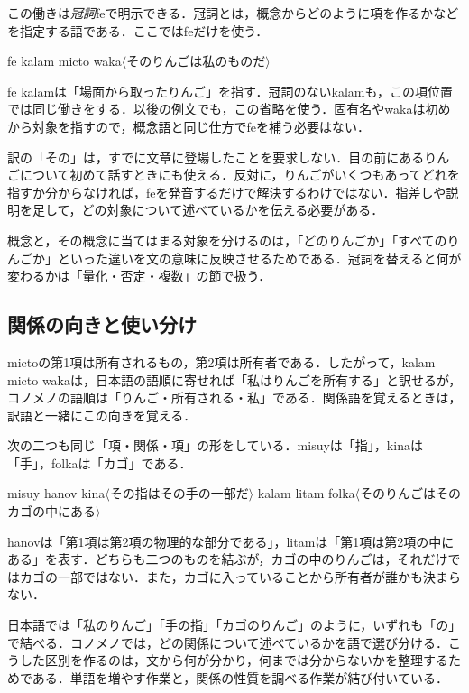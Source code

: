 \documentclass[b5paper, 10pt]{ltjsarticle}
\newcommand{\ko}[1]{\textsf{#1}}
\newcommand{\sentence}[1]{$\langle$#1$\rangle$}
\begin{document}
この働きは\emph{冠詞}\ko{fe}で明示できる．冠詞とは，概念からどのように項を作るかなどを指定する語である．ここでは\ko{fe}だけを使う．
\begin{exe}
    \ex \ko{fe kalam micto waka}\hfill \sentence{そのりんごは私のものだ}
\end{exe}
\ko{fe kalam}は「場面から取ったりんご」を指す．冠詞のない\ko{kalam}も，この項位置では同じ働きをする．以後の例文でも，この省略を使う．固有名や\ko{waka}は初めから対象を指すので，概念語と同じ仕方で\ko{fe}を補う必要はない．

訳の「その」は，すでに文章に登場したことを要求しない．目の前にあるりんごについて初めて話すときにも使える．反対に，りんごがいくつもあってどれを指すか分からなければ，\ko{fe}を発音するだけで解決するわけではない．指差しや説明を足して，どの対象について述べているかを伝える必要がある．

\begin{remark}
    概念と，その概念に当てはまる対象を分けるのは，「どのりんごか」「すべてのりんごか」といった違いを文の意味に反映させるためである．冠詞を替えると何が変わるかは「量化・否定・複数」の節で扱う．
\end{remark}

\subsection{関係の向きと使い分け}
\ko{micto}の第1項は所有されるもの，第2項は所有者である．したがって，\ko{kalam micto waka}は，日本語の語順に寄せれば「私はりんごを所有する」と訳せるが，コノメノの語順は「りんご・所有される・私」である．関係語を覚えるときは，訳語と一緒にこの向きを覚える．

次の二つも同じ「項・関係・項」の形をしている．\ko{misuy}は「指」，\ko{kina}は「手」，\ko{folka}は「カゴ」である．
\begin{exe}
    \ex \ko{misuy hanov kina}\hfill \sentence{その指はその手の一部だ}
    \ex \ko{kalam litam folka}\hfill \sentence{そのりんごはそのカゴの中にある}
\end{exe}
\ko{hanov}は「第1項は第2項の物理的な部分である」，\ko{litam}は「第1項は第2項の中にある」を表す．どちらも二つのものを結ぶが，カゴの中のりんごは，それだけではカゴの一部ではない．また，カゴに入っていることから所有者が誰かも決まらない．

日本語では「私のりんご」「手の指」「カゴのりんご」のように，いずれも「の」で結べる．コノメノでは，どの関係について述べているかを語で選び分ける．こうした区別を作るのは，文から何が分かり，何までは分からないかを整理するためである．単語を増やす作業と，関係の性質を調べる作業が結び付いている．
\end{document}
